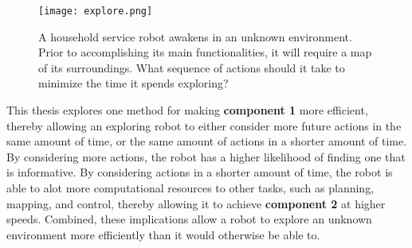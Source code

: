 \begin{figure}[t]
  \centering
  \texttt{[image: explore.png]}
  \caption[A household service robot must explore its unknown environment.]{A
    household service robot awakens in an unknown environment. Prior to
  accomplishing its main functionalities, it will require a map of its surroundings.
What sequence of actions should it take to minimize the time it spends
exploring? \label{fig:motivation}}
\end{figure}

This thesis explores one method for making {\bf component 1} more efficient,
thereby allowing an exploring robot to either consider more future actions in
the same amount of time, or the same amount of actions in a shorter amount of
time. By considering more actions, the robot has a higher likelihood of
finding one that is informative. By considering actions in a shorter amount of
time, the robot is able to alot more computational resources to other tasks,
such as planning, mapping, and control, thereby allowing it to achieve {\bf
component 2} at higher speeds. Combined, these implications allow a robot to explore an unknown
environment more efficiently than it would otherwise be able to.





